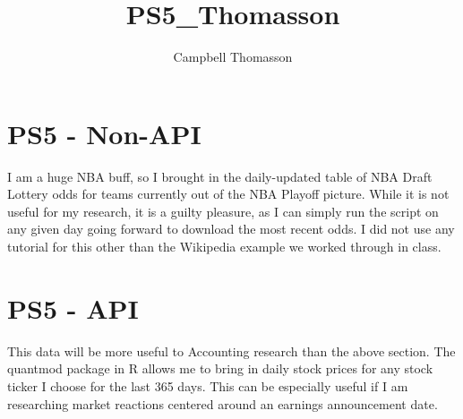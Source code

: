 \documentclass{article}
\title{PS5_Thomasson}
\author{Campbell Thomasson}
\begin{document}
\maketitle

\section{PS5 - Non-API}

I am a huge NBA buff, so I brought in the daily-updated table of NBA Draft Lottery odds for teams currently out of the NBA Playoff picture. While it is not useful for my research, it is a guilty pleasure, as I can simply run the script on any given day going forward to download the most recent odds. I did not use any tutorial for this other than the Wikipedia example we worked through in class.

\section{PS5 - API}

This data will be more useful to Accounting research than the above section. The quantmod package in R allows me to bring in daily stock prices for any stock ticker I choose for the last 365 days. This can be especially useful if I am researching market reactions centered around an earnings announcement date.
\end{document}
